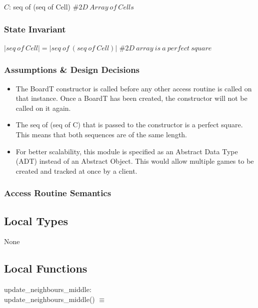 \documentclass[12pt]{article}
\begin{document}
$C$: seq of (seq of Cell) $\mathit{\# 2D \ Array \ of \ Cells}$

\subsubsection* {State Invariant}

$|seq \ of \ Cell| = |seq \ of \ (seq \ of \ Cell)|$ $\mathit{\# 2D \ array 
\ is \ a \ perfect \ square}$

\subsubsection* {Assumptions \& Design Decisions}

\begin{itemize}

\item The BoardT constructor is called before any other access
  routine is called on that instance. Once a BoardT has been created, the
  constructor will not be called on it again.
  
\item The seq of (seq of C) that is passed to the constructor is a perfect square. This means
that both sequences are of the same length.

\item For better scalability, this module is specified as an Abstract Data Type
  (ADT) instead of an Abstract Object. This would allow multiple games to be
  created and tracked at once by a client.

\end{itemize}

\subsubsection* {Access Routine Semantics}

\subsection*{Local Types}

None

\subsection*{Local Functions}

\noindent
update\_neighbours\_middle: \\
update\_neighbours\_middle() $\equiv$ \\
\end{document}
